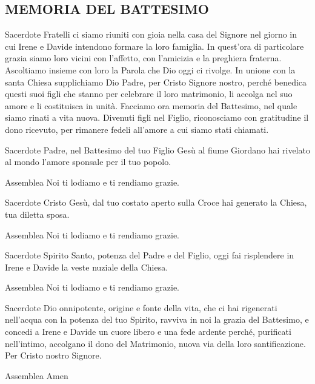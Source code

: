 
\subsection*{MEMORIA DEL BATTESIMO}

\begin{dialoghi}
\item[Sacerdote] Fratelli ci siamo riuniti con gioia nella casa del Signore nel giorno in cui Irene e Davide intendono formare la loro famiglia. In quest'ora di particolare grazia siamo loro vicini con l'affetto, con l'amicizia e la preghiera fraterna. Ascoltiamo insieme con loro la Parola che Dio oggi ci rivolge. In unione con la santa Chiesa supplichiamo Dio Padre, per Cristo Signore nostro, perché benedica questi suoi figli che stanno per celebrare il loro matrimonio, li accolga nel suo amore e li costituisca in unità. Facciamo ora memoria del Battesimo, nel quale siamo rinati a vita nuova. Divenuti figli nel Figlio, riconosciamo con gratitudine il dono ricevuto, per rimanere fedeli all'amore a cui siamo stati chiamati.
\item[Sacerdote] Padre, nel Battesimo del tuo Figlio Gesù al fiume Giordano hai rivelato al mondo l'amore sponsale per il tuo popolo.
\item[Assemblea] Noi ti lodiamo e ti rendiamo grazie.
\item[Sacerdote] Cristo Gesù, dal tuo costato aperto sulla Croce hai generato la Chiesa, tua diletta sposa.
\item[Assemblea] Noi ti lodiamo e ti rendiamo grazie.
\item[Sacerdote] Spirito Santo, potenza del Padre e del Figlio, oggi fai risplendere in Irene e Davide la veste nuziale della Chiesa.
\item[Assemblea] Noi ti lodiamo e ti rendiamo grazie.
\item[Sacerdote] Dio onnipotente, origine e fonte della vita, che ci hai rigenerati nell'acqua con la potenza del tuo Spirito, ravviva in noi la grazia del Battesimo, e concedi a Irene e Davide un cuore libero e una fede ardente perché, purificati nell'intimo, accolgano il dono del Matrimonio, nuova via della loro santificazione. Per Cristo nostro Signore.
\item[Assemblea] Amen
\end{dialoghi}
